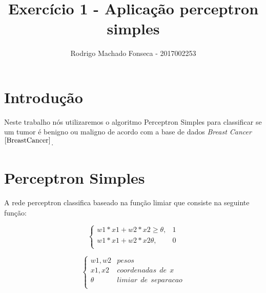 \documentclass[12pt]{article}
\begin{document}

\pagestyle{fancy}
\fancyhf{}
\renewcommand{\headrulewidth}{0.4pt}
\fancyfoot[C]{\thepage}
\renewcommand{\footrulewidth}{0.4pt}
\fancyfoot[C]{\thepage}
\title{\LARGE \bf
 Exercício 1 - Aplicação perceptron simples}
\author{ Rodrigo Machado Fonseca - 2017002253}
\thispagestyle{fancy}
\maketitle
\thispagestyle{fancy}

\section{Introdução}
  \par Neste trabalho nós utilizaremos o algoritmo Perceptron Simples para classificar se um tumor é benigno ou maligno de acordo com a base de dados \textit{Breast Cancer}$^{\ref{BreastCancer}}$.

\section{Perceptron Simples}

  \par A rede perceptron classifica baseado na função limiar que consiste na seguinte função:

\begin{equation}
\left \{
  \begin{array}{cc}
  w1*x1 + w2*x2 \geq \theta, & 1 \\
  w1*x1 + w2*x2  \theta, & 0 \\
  \end{array}
  \right.
  \label{eq:limiar1}
\end{equation}
  
\begin{equation*}
  \left \{
    \begin{array}{cc}
    w1,w2 & pesos \\
    x1,x2 & coordenadas \ \  de \ \ x \\
    \theta & limiar \ \  de \ \  separacao \\
    \end{array}
    \right.
\end{equation*}
\end{document}
